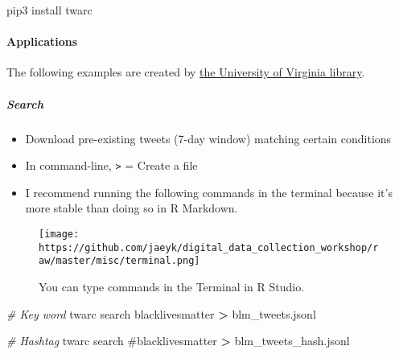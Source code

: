 \documentclass[
]{book}
\newenvironment{Shaded}{\begin{snugshade}}{\end{snugshade}}
\newcommand{\CommentTok}[1]{\textcolor[rgb]{0.56,0.35,0.01}{\textit{#1}}}
\newcommand{\ExtensionTok}[1]{#1}
\newcommand{\NormalTok}[1]{#1}
\newcommand{\OperatorTok}[1]{\textcolor[rgb]{0.81,0.36,0.00}{\textbf{#1}}}
\newcommand{\StringTok}[1]{\textcolor[rgb]{0.31,0.60,0.02}{#1}}
\begin{document}
\begin{Shaded}
\begin{Highlighting}[]
\ExtensionTok{pip3}\NormalTok{ install twarc}
\end{Highlighting}
\end{Shaded}

\hypertarget{applications-1}{%
\paragraph{Applications}\label{applications-1}}

The following examples are created by \href{http://digitalcollecting.lib.virginia.edu/toolkit/docs/social-media/twarc-commands/}{the University of Virginia library}.

\hypertarget{search}{%
\subparagraph{Search}\label{search}}

\begin{itemize}
\item
  Download pre-existing tweets (7-day window) matching certain conditions
\item
  In command-line, \texttt{\textgreater{}} = Create a file
\item
  I recommend running the following commands in the terminal because it's more stable than doing so in R Markdown.
\end{itemize}

\begin{figure}
\centering
\texttt{[image: https://github.com/jaeyk/digital\_data\_collection\_workshop/raw/master/misc/terminal.png]}
\caption{You can type commands in the Terminal in R Studio.}
\end{figure}

\begin{Shaded}
\begin{Highlighting}[]
\CommentTok{\# Key word }
\ExtensionTok{twarc}\NormalTok{ search blacklivesmatter }\OperatorTok{\textgreater{}}\NormalTok{ blm\_tweets.jsonl}
\end{Highlighting}
\end{Shaded}

\begin{Shaded}
\begin{Highlighting}[]
\CommentTok{\# Hashtag }
\ExtensionTok{twarc}\NormalTok{ search }\StringTok{\textquotesingle{}\#blacklivesmatter\textquotesingle{}} \OperatorTok{\textgreater{}}\NormalTok{ blm\_tweets\_hash.jsonl}
\end{Highlighting}
\end{Shaded}
\end{document}
